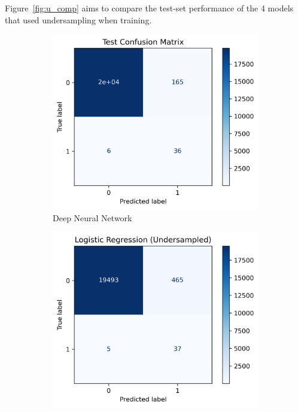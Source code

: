 \documentclass[utf8x]{ctexart}
\begin{document}
Figure~\ref{fig:u_comp} aims to compare the test-set performance of the 4 models that used undersampling when training.

\begin{figure}[htb]
  \centering
  \begin{subfigure}[b]{0.48\textwidth}
    \centering
    \includegraphics[width=\textwidth]{./images/undersampled_net(d4_k8)_E2000_LR0.0001_B32/conf_test.png}
    \caption{Deep Neural Network}
    \label{fig:u_1}
  \end{subfigure}
  \begin{subfigure}[b]{0.48\textwidth}
    \centering
    \includegraphics[width=\textwidth]{./images/reg_conf1_u.png}

\end{subfigure}
\end{figure}
\end{document}
